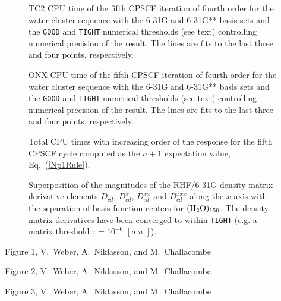 \documentclass[prl,aps,preprint,showpacs,superbib]{revtex4}
\begin{document}
{\begin{figure}[h]
  \caption{\protect
    TC2 CPU time of the fifth CPSCF iteration of fourth order for
    the water cluster sequence with the 6-31G and 6-31G** 
    basis sets and the {\tt GOOD} and {\tt TIGHT} 
    numerical thresholds (see text) controlling numerical
    precision of the result. The lines are fits to the 
    last three and four points, respectively.
  }\label{fig:Gamma_TC2R_Timing}

  \caption{\protect
    ONX CPU time of the fifth CPSCF iteration of fourth order for
    the water cluster sequence with the 6-31G and 6-31G** 
    basis sets and the {\tt GOOD} and {\tt TIGHT} 
    numerical thresholds (see text) controlling numerical
    precision of the result. The lines are fits to the 
    last three and four points, respectively.
  }\label{fig:Gamma_ONX_Timing}

  \caption{Total CPU times with increasing order of the response for 
           the fifth CPSCF cycle computed as the $n+1$ expectation value, Eq.~(\ref{Np1Rule}).}\label{TimeWithOrder}

  \caption{\protect
    Superposition of the magnitudes of the RHF/6-31G density matrix
    derivative elements $D_{cd}$, $D^{x}_{cd}$, $D^{xx}_{cd}$ and $D^{xxx}_{cd}$
    along the $x$ axis with the separation of basis function centers
    for $\rm (H_2O)_{150}$. The density matrix 
    derivatives have been converged to within {\tt TIGHT} (e.g. 
    a matrix threshold $\tau=10^{-6}$ $[a.u.]$).
  }\label{fig:Superposition_Decay}


\end{figure}

\clearpage

\begin{center}
Figure 1, V.~Weber, A.~Niklasson,  and M.~Challacombe \\[1.cm]
\end{center}

\clearpage

\begin{center}
Figure 2, V.~Weber, A.~Niklasson,  and M.~Challacombe \\[1.cm]
\end{center}

\clearpage

\begin{center}
Figure 3, V.~Weber, A.~Niklasson,  and M.~Challacombe \\[1.cm]
\end{center}

}
\end{document}
